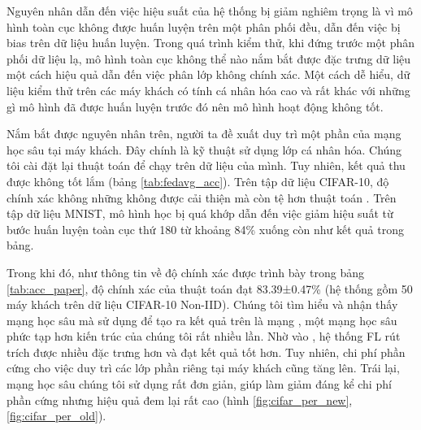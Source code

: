 Nguyên nhân dẫn đến việc hiệu suất của hệ thống bị giảm nghiêm trọng là vì mô hình toàn cục không được huấn luyện trên một phân phối đều, dẫn đến việc bị bias trên dữ liệu huấn luyện. Trong quá trình kiểm thử, khi đứng trước một phân phối dữ liệu lạ, mô hình toàn cục không thể nào nắm bắt được đặc trưng dữ liệu một cách hiệu quả dẫn đến việc phân lớp không chính xác. Một cách dễ hiểu, dữ liệu kiểm thử trên các máy khách có tính cá nhân hóa cao và rất khác với những gì mô hình đã được huấn luyện trước đó nên mô hình hoạt động không tốt.

Nắm bắt được nguyên nhân trên, người ta đề xuất duy trì một phần của mạng học sâu tại máy khách. Đây chính là kỹ thuật sử dụng lớp cá nhân hóa. Chúng tôi cài đặt lại thuật toán  để chạy trên dữ liệu của mình. Tuy nhiên, kết quả thu được không tốt lắm (bảng \ref{tab:fedavg_acc}). Trên tập dữ liệu CIFAR-10, độ chính xác không những không được cải thiện mà còn tệ hơn thuật toán . Trên tập dữ liệu MNIST, mô hình học bị quá khớp dẫn đến việc giảm hiệu suất từ bước huấn luyện toàn cục thứ 180 từ khoảng 84\% xuống còn như kết quả trong bảng. 

Trong khi đó, như thông tin về độ chính xác được trình bày trong bảng \ref{tab:acc_paper}, độ chính xác của thuật toán  đạt 83.39±0.47\% (hệ thống gồm 50 máy khách trên dữ liệu CIFAR-10 Non-IID). Chúng tôi tìm hiểu và nhận thấy mạng học sâu mà  sử dụng để tạo ra kết quả trên là mạng  \cite{howard2017mobilenets}, một mạng học sâu phức tạp hơn kiến trúc của chúng tôi rất nhiều lần. Nhờ vào , hệ thống FL rút trích được nhiều đặc trưng hơn và đạt kết quả tốt hơn. Tuy nhiên, chi phí phần cứng cho việc duy trì các lớp phần riêng tại máy khách cũng tăng lên. Trái lại, mạng học sâu chúng tôi sử dụng rất đơn giản, giúp làm giảm đáng kể chi phí phần cứng nhưng hiệu quả đem lại rất cao (hình \ref{fig:cifar_per_new}, \ref{fig:cifar_per_old}).

